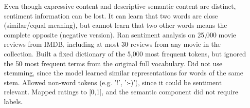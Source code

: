 Even though expressive content and descriptive semantic content are distinct, sentiment information can be lost. 
It can learn that two words are close (similar/equal meaning), but cannot learn that two other words means the complete opposite (negative version).
Ran sentiment analysis on 25,000 movie reviews from IMDB, including at most 30 reviews from any movie in the collection. 
Built a fixed dictionary of the 5,000 most frequent tokens, but ignored the 50 most frequent terms from the original full vocabulary. 
Did not use stemming, since the model learned similar representations for words of the same stem.
Allowed non-word tokens (e.g. '!', ':-)'), since it could be sentiment relevant. 
Mapped ratings to [0,1], and the semantic component did not require labels.
\cite{Maas2011}	




